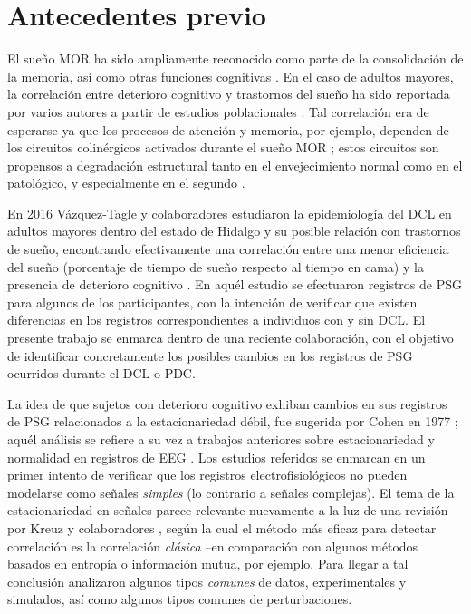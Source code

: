 
\section{Antecedentes previo}

El sueño MOR ha sido ampliamente reconocido como parte de la consolidación de la memoria, así como
otras funciones cognitivas 
\cite{Fishbein1971,Fishbein1977,Lucero1970,Pearlman1971,Pearlman1974,Smith1991}.
%
En el caso de adultos mayores, la correlación entre deterioro cognitivo y trastornos del sueño ha 
sido reportada por varios autores a partir de estudios poblacionales 
\cite{Amer13,Miyata13,Reid06,Potvin12}.
%
Tal correlación era de esperarse ya que los procesos de atención y memoria, por ejemplo, dependen de 
los circuitos colinérgicos activados durante el sueño MOR \cite{Braun1997}; estos circuitos son 
propensos a degradación estructural tanto en el envejecimiento normal como en el patológico,  y 
especialmente en el segundo \cite{Schliebs11}.

En 2016 Vázquez-Tagle y colaboradores estudiaron la epidemiología del DCL en adultos mayores dentro 
del estado de Hidalgo y su posible relación con trastornos de sueño, encontrando efectivamente una 
correlación entre una menor eficiencia del sueño (porcentaje de tiempo de sueño respecto al tiempo 
en cama) y la presencia de deterioro cognitivo \cite{VazquezTagle16}.
%
En aquél estudio se efectuaron registros de PSG para algunos de los participantes, con la intención 
de verificar que existen diferencias en los registros correspondientes a individuos con y sin DCL.
%
El presente trabajo se enmarca dentro de una reciente colaboración, con el objetivo de identificar concretamente
los posibles cambios en los registros de PSG  ocurridos durante el DCL o PDC.

La idea de que sujetos con deterioro cognitivo exhiban cambios en sus registros de PSG relacionados 
a la estacionariedad débil, fue sugerida por Cohen en 1977 \cite{Cohen77}; aquél análisis se 
refiere a su vez a trabajos anteriores sobre estacionariedad y normalidad en registros de EEG
\cite{McEwen75,Sugimoto78,Kawabata73}.
%
Los estudios referidos se enmarcan en un primer intento de verificar que los registros 
electrofisiológicos no pueden modelarse como señales \textit{simples} (lo contrario a señales 
complejas).
%
El tema de la estacionariedad en señales parece relevante nuevamente a la luz de una revisión
por Kreuz y colaboradores \cite{Kreuz07}, según la cual el método más eficaz para detectar 
correlación es la correlación \textit{clásica} --en comparación con algunos métodos basados en 
entropía o información mutua, por ejemplo. 
%
Para llegar a tal conclusión analizaron algunos tipos \textit{comunes} de datos, experimentales y 
simulados, así como algunos tipos comunes de perturbaciones.

